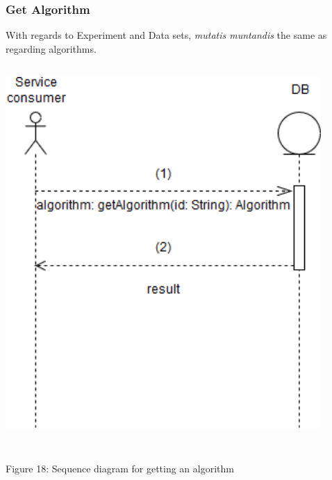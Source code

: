    \subsubsection{Get Algorithm}
    \par With regards to Experiment and Data sets,
    { \textit{mutatis muntandis} the same as regarding algorithms.} \newline \newline
    \includegraphics[width=12cm,height=15cm,keepaspectratio]{input_unit/images/get_algorithm_sequence_diagram.png}
    \begin{center}
    	\small{Figure 18: Sequence diagram for getting an algorithm }
    \end{center}
    \newpage
